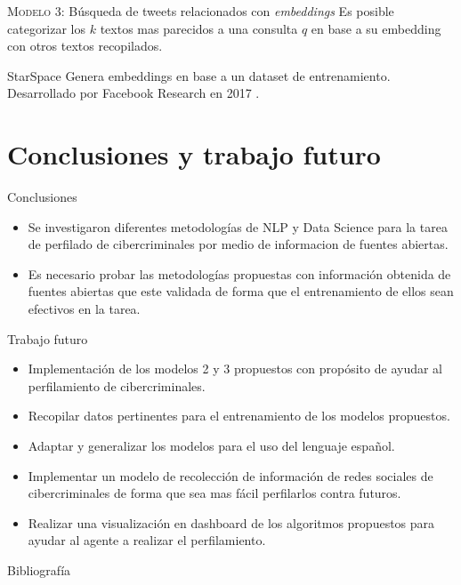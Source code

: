 \documentclass[10pt]{beamer}
\begin{document}
\begin{frame}{\textsc{Modelo 3:} Búsqueda de tweets relacionados con \emph{embeddings}}
  Es posible categorizar los $k$ textos mas parecidos a una consulta $q$ en base a su embedding con otros textos recopilados.

  \begin{alertblock}{StarSpace}
    Genera embeddings en base a un dataset de entrenamiento. Desarrollado por Facebook Research en 2017 \cite{starspace}. 
  \end{alertblock}
\end{frame}

\section{Conclusiones y trabajo futuro}

\begin{frame}{Conclusiones}
  \begin{itemize}
  \item Se investigaron diferentes metodologías de NLP y Data Science para la tarea de perfilado de cibercriminales por medio de informacion de fuentes abiertas.
  \item Es necesario probar las metodologías propuestas con información obtenida de fuentes abiertas que este validada de forma que el entrenamiento de ellos sean efectivos en la tarea.
  \end{itemize}
\end{frame}

\begin{frame}{Trabajo futuro}
  \begin{itemize}
  \item Implementación de los modelos 2 y 3 propuestos con propósito de ayudar al perfilamiento de cibercriminales.
  \item Recopilar datos pertinentes para el entrenamiento de los modelos propuestos.
  \item Adaptar y generalizar los modelos para el uso del lenguaje español.
  \item Implementar un modelo de recolección de información de redes sociales de cibercriminales de forma que sea mas fácil perfilarlos contra futuros.
  \item Realizar una visualización en dashboard de los algoritmos propuestos para ayudar al agente a realizar el perfilamiento.
  \end{itemize}
\end{frame}

\appendix
{}
\begin{frame}[allowframebreaks]{Bibliografía}

  
  

\end{frame}
\end{document}
